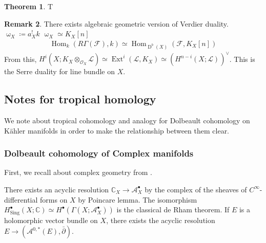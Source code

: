 \documentclass[a4paper,dvipdfmx,reqno,12pt]{amsart}
\theoremstyle{definition}
\newtheorem{Thm}{Theorem}[section]
\newtheorem{Rmk}[Thm]{Remark}
\newcommand{\deq}{\coloneqq}
\newcommand{\C}{\mathbb{C}}%
\newcommand{\mcal}[1]{\mathcal{#1}}%
\newcommand{\opn}[1]{\operatorname{#1}}
\numberwithin{equation}{section}
\begin{document}
\begin{Thm}
T
\end{Thm}



\begin{Rmk}
  There exists algebraic geometric version of Verdier duality.
  $\upomega_X\deq a_X^{!}k$
  $\upomega_X\simeq K_X[n]$
  \begin{align}
    \opn{Hom}_k(R\Gamma (\mcal{F}),k)\simeq \opn{Hom}_{\opn{D}^{b}(X)}(\mcal{F}, K_X[n])
  \end{align}
  From this, $H^{i}(X;K_X\otimes_{\mcal{O}_X} \mcal{L})\simeq \opn{Ext}^{i}(\mcal{L},K_X)\simeq (H^{n-i}(X;\mcal{L}))^{\vee}$. This is the Serre duality for line bundle on $X$.
\end{Rmk}

\subsection{Notes for tropical homology}
We note about tropical cohomology and analogy for Dolbeault
cohomology on K\"ahler manifolds in order to make
the relationship between them clear.

\subsubsection{Dolbeault cohomology of Complex manifolds}

First, we recall about complex geometry from \cite{MR2093043,MR2451566}.


There exists an acyclic resolution $\C_X \to \mcal{A}_X^{\bullet}$
by the complex of the sheaves of $C^{\infty}$-differential forms
on $X$ by Poincare lemma.
The isomorphism $H^{\bullet}_{\opn{Sing}}(X;\C)
  \simeq H^{\bullet}(\Gamma(X;\mcal{A}_X^{\bullet}))$ is the classical
de Rham theorem.
If $E$ is a holomorphic vector bundle on $X$, there exists
the acyclic resolution
$E\to (\mcal{A}^{0,*}(E),\bar{\partial})$.
\end{document}
